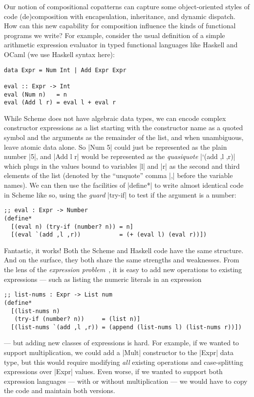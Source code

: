 Our notion of compositional copatterns can capture some object-oriented styles of code (de)composition with encapsulation, inheritance, and dynamic dispatch.
How can this new capability for composition influence the kinds of functional programs we write?
For example, consider the usual definition of a simple arithmetic expression evaluator in typed functional languages like Haskell and OCaml (we use Haskell syntax here):
\begin{verbatim}
data Expr = Num Int | Add Expr Expr

eval :: Expr -> Int
eval (Num n)   = n
eval (Add l r) = eval l + eval r
\end{verbatim}
While Scheme does not have algebraic data types, we can encode complex constructor expressions as a list starting with the constructor name as a quoted symbol and the arguments as the remainder of the list, and when unambiguous, leave atomic data alone.
So \hs|Num 5| could just be represented as the plain number \scm|5|, and \scm|Add l r| would be represented as the \emph{quasiquote} \scm|`(add ,l ,r)| which plugs in the values bound to variables \scm|l| and \scm|r| as the second and third elements of the list (denoted by the ``unquote'' comma \scm|,| before the variable names).
We can then use the facilities of \scm|define*| to write almost identical code in Scheme like so, using the \emph{guard} \scm|try-if| to test if the argument is a number:
\begin{verbatim}
;; eval : Expr -> Number
(define*
  [(eval n) (try-if (number? n)) = n]
  [(eval `(add ,l ,r))           = (+ (eval l) (eval r))])
\end{verbatim}
Fantastic, it works!
Both the Scheme and Haskell code have the same structure.
And on the surface, they both share the same strengths and weaknesses.
From the lens of the \emph{expression problem}~\cite{ExpressionProblem}, it is easy to add new operations to existing expressions --- such as listing the numeric literals in an expression
\begin{verbatim}
;; list-nums : Expr -> List num
(define*
  [(list-nums n)
   (try-if (number? n))     = (list n)]
  [(list-nums `(add ,l ,r)) = (append (list-nums l) (list-nums r))])
\end{verbatim}
--- but adding new classes of expressions is hard.
For example, if we wanted to support multiplication, we could add a \hs|Mult| constructor to the \hs|Expr| data type, but this would require modifying \emph{all} existing operations and case-splitting expressions over \hs|Expr| values.
Even worse, if we wanted to support both expression languages --- with or without multiplication --- we would have to copy the code and maintain both versions.

